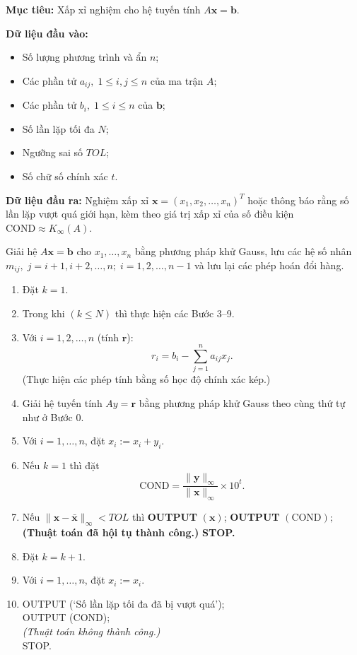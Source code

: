 \textbf{Mục tiêu:}  
Xấp xỉ nghiệm cho hệ tuyến tính $A\mathbf{x} = \mathbf{b}$.

\textbf{Dữ liệu đầu vào:}
\begin{itemize}
    \item Số lượng phương trình và ẩn $n$;
    \item Các phần tử $a_{ij},\; 1 \leq i, j \leq n$ của ma trận $A$;
    \item Các phần tử $b_i,\; 1 \leq i \leq n$ của $\mathbf{b}$;
    \item Số lần lặp tối đa $N$;
    \item Ngưỡng sai số $TOL$;
    \item Số chữ số chính xác $t$.
\end{itemize}

\textbf{Dữ liệu đầu ra:}  
Nghiệm xấp xỉ $\mathbf{x} = (x_1, x_2, \dots, x_n)^{T}$ hoặc thông báo rằng số lần lặp vượt quá giới hạn, kèm theo giá trị xấp xỉ của số điều kiện $\text{COND} \approx K_{\infty}(A)$.


Giải hệ $A\mathbf{x} = \mathbf{b}$ cho $x_1, \dots, x_n$ bằng phương pháp khử Gauss, lưu các hệ số nhân $m_{ij},\; j = i+1, i+2, \dots, n;\; i = 1, 2, \dots, n-1$ và lưu lại các phép hoán đổi hàng.

\begin{enumerate}[label=\textbf{Step \arabic*:}, leftmargin=2.5em]

\item Đặt $k = 1$.

\item Trong khi $(k \leq N)$ thì thực hiện các Bước 3–9.

\item Với $i = 1, 2, \dots, n$ (tính $\mathbf{r}$):
\[
r_i = b_i - \sum_{j=1}^{n} a_{ij}x_j.
\]
(Thực hiện các phép tính bằng số học độ chính xác kép.)

\item Giải hệ tuyến tính $A y = \mathbf{r}$ bằng phương pháp khử Gauss theo cùng thứ tự như ở Bước 0.

\item Với $i = 1, \dots, n$, đặt $x_i := x_i + y_i$.

\item Nếu $k = 1$ thì đặt 
\[
\text{COND} = \frac{\|\mathbf{y}\|_{\infty}}{\|\mathbf{x}\|_{\infty}} \times 10^{t}.
\]

\item Nếu $\|\mathbf{x} - \bar{\mathbf{x}}\|_{\infty} < TOL$ thì  
\textbf{OUTPUT} $(\mathbf{x})$;  
\textbf{OUTPUT} $(\text{COND});$  
\textbf{(Thuật toán đã hội tụ thành công.)}  
\textbf{STOP.}

\item Đặt $k = k + 1$.

\item Với $i = 1, \dots, n$, đặt $x_i := x_i$.

\item OUTPUT (‘Số lần lặp tối đa đã bị vượt quá’); \\
OUTPUT (COND); \\
\textit{(Thuật toán không thành công.)} \\
STOP.

\end{enumerate}


